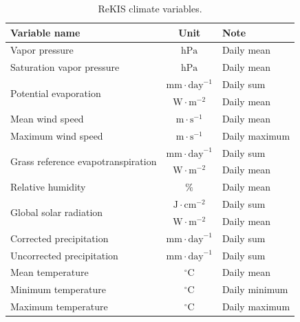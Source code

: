 {
\shorthandoff{-}
\begin{table}[htbp]
    \centering
    \begin{tabular}{|l|c|l|}
        \hline
        \textbf{Variable name}              & \textbf{Unit} & \textbf{Note} \\ 
        \hline
        Vapor pressure                     & $\text{hPa}$ & Daily mean \\ 
        \hline
        Saturation vapor pressure          & $\text{hPa}$ & Daily mean \\ 
        \hline
        \multirow{2}{*}{Potential evaporation}              & $\text{mm} \cdot \text{day}^{-1}$ & Daily sum \\ 
        \cline{2-3}
        & $\text{W} \cdot \text{m}^{-2}$ & Daily mean \\         
        \hline
        Mean wind speed                    & $\text{m} \cdot \text{s}^{-1}$ & Daily mean \\ 
        \hline
        Maximum wind speed                 & $\text{m} \cdot \text{s}^{-1}$ & Daily maximum \\ 
        \hline
        \multirow{2}{*}{Grass reference evapotranspiration} & $\text{mm} \cdot \text{day}^{-1}$ & Daily sum \\ 
        \cline{2-3}
        & $\text{W} \cdot \text{m}^{-2}$ & Daily mean \\ 
        \hline
        Relative humidity                  & $\text{\%}$ & Daily mean \\ 
        \hline
        \multirow{2}{*}{Global solar radiation} & $\text{J} \cdot \text{cm}^{-2}$ & Daily sum \\ 
        \cline{2-3}
        & $\text{W} \cdot \text{m}^{-2}$ & Daily mean \\ 
        \hline
        Corrected precipitation            & $\text{mm} \cdot \text{day}^{-1}$ & Daily sum \\ 
        \hline
        Uncorrected precipitation          & $\text{mm} \cdot \text{day}^{-1}$ & Daily sum \\ 
        \hline
        Mean temperature                   & $^\circ\text{C}$ & Daily mean \\ 
        \hline
        Minimum temperature                & $^\circ\text{C}$ & Daily minimum \\ 
        \hline
        Maximum temperature                & $^\circ\text{C}$ & Daily maximum \\ 
        \hline
    \end{tabular}
    \caption[ReKIS climate variables]{ReKIS climate variables.}
    \label{tab:ReKISdata}
\end{table}
}

